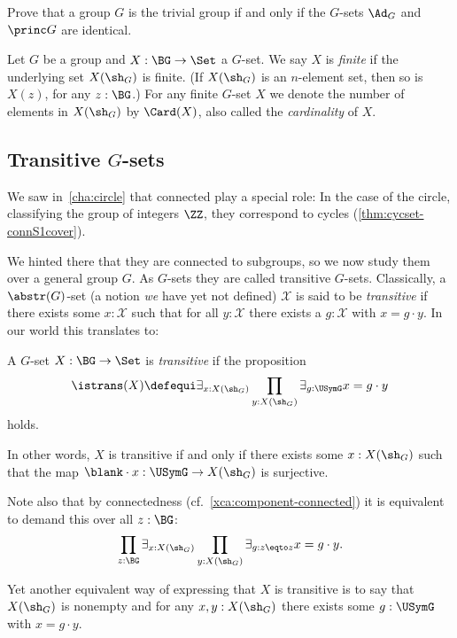 \begin{xca}\label{xca:Ad-princ-trivial}
  Prove that a group $G$ is the trivial group if and only if the $G$-sets $\Ad_G$ and
  $\princ G$ are identical.
\end{xca}

\begin{definition}\label{def:finite-G-set}
Let $G$ be a group and $X:\BG\to\Set$ a $G$-set.
We say $X$ is \emph{finite} if the underlying set $X(\sh_G)$ is finite.
(If $X(\sh_G)$ is an $n$-element set, then so is $X(z)$, for any $z:\BG$.)
For any finite $G$-set $X$ we denote the number of elements
in $X(\sh_G)$ by $\Card(X)$, also called the \emph{cardinality} of $X$.
\end{definition}

\subsection{Transitive $G$-sets}
\label{sec:transitiveGsets}
We saw in~\cref{cha:circle} that connected \coverings play a special role:
In the case of the circle, classifying the group of integers $\ZZ$,
they correspond to cycles (\cref{thm:cycset-connS1cover}).

We hinted there that they are connected to subgroups, so
we now study them over a general group $G$.
As $G$-sets they are called transitive $G$-sets.
Classically, a $\abstr(G)$-set (a notion \emph{we} have yet not defined) $\mathcal X$ is said to be \emph{transitive} if there exists some $x:\mathcal X$ such that for all $y:\mathcal X$ there exists a $g:\mathcal X$ with $x=g\cdot y$.  In our world this translates to:
\begin{definition}\label{def:transitiveGset}
  A $G$-set $X:\BG\to\Set$ is \emph{transitive} if the proposition
  \[
    \istrans(X) \defequi
    \exists_{x:X(\sh_G)} \prod_{y:X(\sh_G)} \exists_{g:\USymG} x=g\cdot y
  \]
  holds.
\end{definition}
\begin{remark}
  In other words, $X$ is transitive if and only if there exists
  some $x:X(\sh_G)$ such that the map $\blank\cdot x:\USymG\to X(\sh_G)$ is
  surjective.

  Note also that by connectedness (cf.~\cref{xca:component-connected})
  it is equivalent to demand this over all $z:\BG$:
  \begin{equation}\label{eq:Gset-trans-gen}
    \prod_{z:\BG}\exists_{x:X(\sh_G)}
    \prod_{y:X(\sh_G)}\exists_{g:z\eqto z}x=g\cdot y.
  \end{equation}

  Yet another equivalent way of expressing that $X$ is transitive is to say
  that $X(\sh_G)$ is nonempty and for any $x,y:X(\sh_G)$ there
  exists some $g:\USymG$ with $x = g\cdot y$.
\end{remark}

